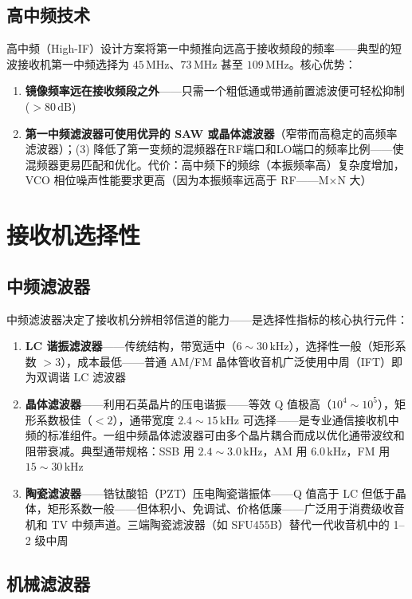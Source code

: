 \documentclass[12pt,UTF8]{ctexbook}
\begin{document}
\subsection{高中频技术}

高中频（High-IF）设计方案将第一中频推向远高于接收频段的频率——典型的短波接收机第一中频选择为 $45\,\mathrm{MHz}$、$73\,\mathrm{MHz}$ 甚至 $109\,\mathrm{MHz}$。核心优势：
\begin{enumerate}
\item \textbf{镜像频率远在接收频段之外}——只需一个粗低通或带通前置滤波便可轻松抑制($>80\,\mathrm{dB}$)
\item \textbf{第一中频滤波器可使用优异的 SAW 或晶体滤波器}（窄带而高稳定的高频率滤波器）；(3) 降低了第一变频的混频器在RF端口和LO端口的频率比例——使混频器更易匹配和优化。代价：高中频下的频综（本振频率高）复杂度增加，VCO 相位噪声性能要求更高（因为本振频率远高于 RF——M×N 大）
\end{enumerate}

\section{接收机选择性}
\label{sec:rx_selectivity}

\subsection{中频滤波器}

中频滤波器决定了接收机分辨相邻信道的能力——是选择性指标的核心执行元件：
\begin{enumerate}
\item \textbf{LC 谐振滤波器}——传统结构，带宽适中（$6\sim30\,\mathrm{kHz}$），选择性一般（矩形系数 $>3$），成本最低——普通 AM/FM 晶体管收音机广泛使用中周（IFT）即为双调谐 LC 滤波器
\item \textbf{晶体滤波器}——利用石英晶片的压电谐振——等效 Q 值极高（$10^4\sim10^5$），矩形系数极佳（$<2$），通带宽度 $2.4\sim15\,\mathrm{kHz}$ 可选择——是专业通信接收机中频的标准组件。一组中频晶体滤波器可由多个晶片耦合而成以优化通带波纹和阻带衰减。典型通带规格：SSB 用 $2.4\sim3.0\,\mathrm{kHz}$，AM 用 $6.0\,\mathrm{kHz}$，FM 用 $15\sim30\,\mathrm{kHz}$
\item \textbf{陶瓷滤波器}——锆钛酸铅（PZT）压电陶瓷谐振体——Q 值高于 LC 但低于晶体，矩形系数一般——但体积小、免调试、价格低廉——广泛用于消费级收音机和 TV 中频声道。三端陶瓷滤波器（如 SFU455B）替代一代收音机中的 1–2 级中周
\end{enumerate}

\subsection{机械滤波器}
\end{document}

